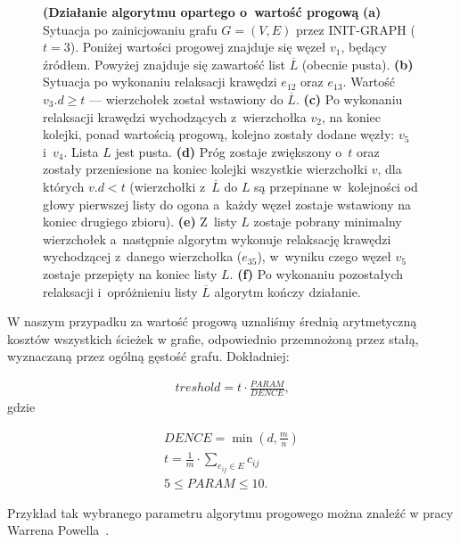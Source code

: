 \begin{figure}[!h]
\begin{subfigure}[b]{0.32\textwidth}
		\caption{}
	\end{subfigure}
	\caption{ \textbf{(Działanie algorytmu opartego o~wartość progową} \textbf{(a)} Sytuacja po zainicjowaniu grafu $G = \left( V, E \right)$ przez \textsf{INIT-GRAPH} ($t=3$). Poniżej wartości progowej znajduje się węzeł $v_{1}$, będący źródłem. Powyżej znajduje się zawartość list $\overline{L}$ (obecnie pusta). \textbf{(b)} Sytuacja po wykonaniu relaksacji krawędzi $e_{12}$ oraz $e_{13}$. Wartość $v_{3}.d \geqslant t$ --- wierzchołek został wstawiony do $\overline{L}$. \textbf{(c)} Po wykonaniu relaksacji krawędzi wychodzących z~wierzchołka $v_{2}$, na koniec kolejki, ponad wartością progową, kolejno zostały dodane węzły: $v_{5}$ i~$v_{4}$. Lista $L$ jest pusta. \textbf{(d)} Próg zostaje zwiększony o~$t$ oraz zostały przeniesione na koniec kolejki wszystkie wierzchołki $v$, dla których $v.d < t$ (wierzchołki z~$\overline{L}$ do $L$ są przepinane w~kolejności od głowy pierwszej listy do ogona a~każdy węzeł zostaje wstawiony na koniec drugiego zbioru). \textbf{(e)} Z~listy $L$ zostaje pobrany minimalny wierzchołek a~następnie algorytm wykonuje relaksację krawędzi wychodzącej z~danego wierzchołka ($e_{35}$), w~wyniku czego węzeł $v_{5}$ zostaje przepięty na koniec listy $L$. \textbf{(f)} Po wykonaniu pozostałych relaksacji i~opróżnieniu listy $\overline{L}$ algorytm kończy działanie. } \label{fig:exampleThreshold}
\end{figure}

W naszym przypadku za wartość progową uznaliśmy średnią arytmetyczną kosztów wszystkich ścieżek w grafie, odpowiednio przemnożoną przez stałą, wyznaczaną przez ogólną gęstość grafu. Dokładniej:

\begin{eqnarray}
treshold = t \cdot \frac{PARAM}{DENCE}\textrm{,}
\end{eqnarray}
gdzie

\begin{eqnarray}
DENCE = \min \left( d, \frac{m}{n}\right) \\
t = \frac{1}{m} \cdot \sum_{e_{ij} \in E} c_{ij} \\
5 \leqslant PARAM \leqslant 10\textrm{.}
\end{eqnarray}

Przykład tak wybranego parametru algorytmu progowego można znaleźć w pracy Warrena Powella~\cite[$2$]{Threshold}.